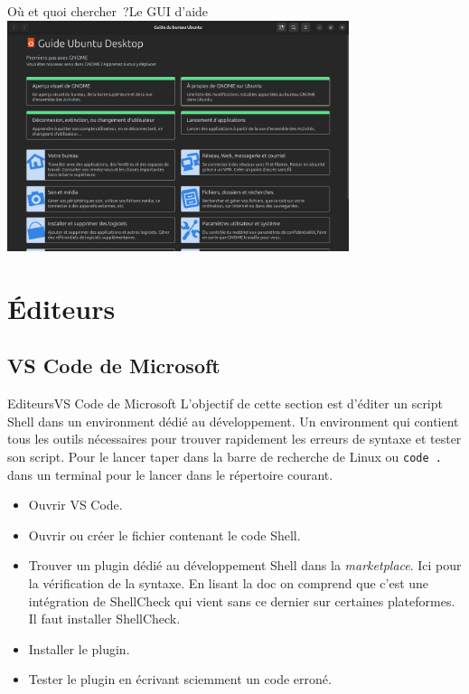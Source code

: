 \documentclass{beamer}
\begin{document}
    \begin{frame}{Où et quoi chercher~?}{Le GUI d'aide}
        \centering
        \includegraphics[width=10cm]{image/aide}
    \end{frame}


    \section{Éditeurs}\label{sec:editor}

    \subsection{VS Code de Microsoft}\label{subsec:vscode}

    \begin{frame}{Editeurs}{VS Code de Microsoft}
        L'objectif de cette section est d'éditer un script Shell dans un environment dédié au développement.
        Un environment qui contient tous les outils nécessaires pour trouver rapidement les erreurs de syntaxe et tester son script.
        \bigbreak
        Pour le lancer taper  dans la barre de recherche de Linux ou \lstinline{code .} dans un terminal pour le lancer dans le répertoire courant.
        \begin{itemize}
            \item Ouvrir VS Code.
            \item Ouvrir ou créer le fichier contenant le code Shell.
            \item Trouver un plugin dédié au développement Shell dans la \textit{marketplace}.
            Ici  pour la vérification de la syntaxe.
            En lisant la doc on comprend que c'est une intégration de ShellCheck qui vient sans ce dernier sur certaines plateformes.
            Il faut installer ShellCheck.
            \item Installer le plugin.
            \item Tester le plugin en écrivant sciemment un code erroné.
        \end{itemize}
    \end{frame}
\end{document}
